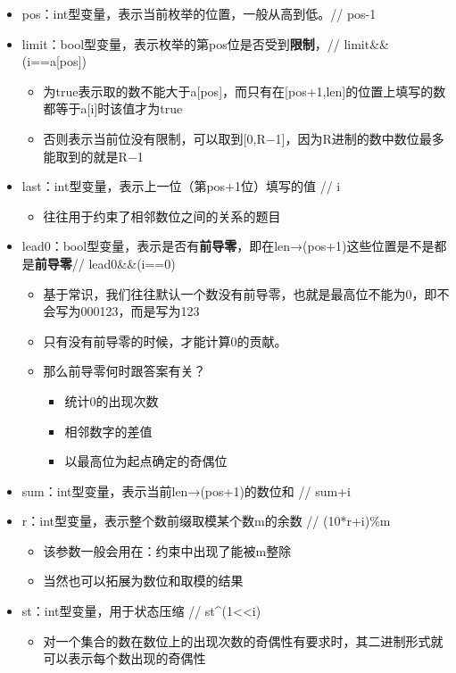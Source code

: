 \documentclass[]{article}
\providecommand{\tightlist}{%
  \setlength{\itemsep}{0pt}\setlength{\parskip}{0pt}}
\begin{document}
\begin{itemize}
\item
  pos：int型变量，表示当前枚举的位置，一般从高到低。// pos-1
\item
  limit：bool型变量，表示枚举的第pos位是否受到\textbf{限制}，//
  limit\&\&(i==a{[}pos{]})

  \begin{itemize}
  \tightlist
  \item
    为true表示取的数不能大于a{[}pos{]}，而只有在{[}pos+1,len{]}的位置上填写的数都等于a{[}i{]}时该值才为true
  \item
    否则表示当前位没有限制，可以取到{[}0,R−1{]}，因为R进制的数中数位最多能取到的就是R−1
  \end{itemize}
\item
  last：int型变量，表示上一位（第pos+1位）填写的值 // i

  \begin{itemize}
  \tightlist
  \item
    往往用于约束了相邻数位之间的关系的题目
  \end{itemize}
\item
  lead0：bool型变量，表示是否有\textbf{前导零}，即在len→(pos+1)这些位置是不是都是\textbf{前导零}//
  lead0\&\&(i==0)

  \begin{itemize}
  \item
    基于常识，我们往往默认一个数没有前导零，也就是最高位不能为0，即不会写为000123，而是写为123
  \item
    只有没有前导零的时候，才能计算0的贡献。
  \item
    那么前导零何时跟答案有关？

    \begin{itemize}
    \tightlist
    \item
      统计0的出现次数
    \item
      相邻数字的差值
    \item
      以最高位为起点确定的奇偶位
    \end{itemize}
  \end{itemize}
\item
  sum：int型变量，表示当前len→(pos+1)的数位和 // sum+i
\item
  r：int型变量，表示整个数前缀取模某个数m的余数 // (10*r+i)\%m

  \begin{itemize}
  \tightlist
  \item
    该参数一般会用在：约束中出现了能被m整除
  \item
    当然也可以拓展为数位和取模的结果
  \end{itemize}
\item
  st：int型变量，用于状态压缩 // st\^{}(1\textless{}\textless{}i)

  \begin{itemize}
  \tightlist
  \item
    对一个集合的数在数位上的出现次数的奇偶性有要求时，其二进制形式就可以表示每个数出现的奇偶性
  \end{itemize}
\end{itemize}
\end{document}
